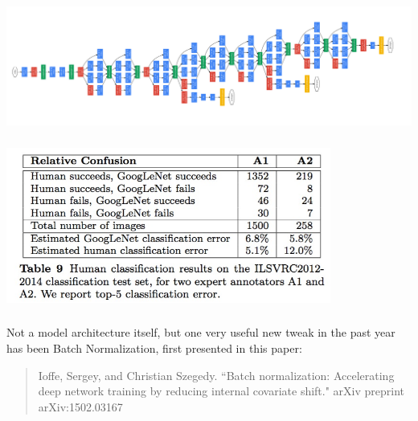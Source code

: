 \documentclass[xetex,mathserif,serif,aspectratio=169]{beamer}
\begin{document}
\begin{frame}[fragile] \frametitle{} \oldB \small

\begin{center}
\includegraphics[width=\textwidth]{img/googlenet_diagram.png}
\end{center}

\end{frame}

\begin{frame}[fragile] \frametitle{} \oldB \small

\textbf{}

\end{frame}

\begin{frame}[fragile] \frametitle{} \oldB \small

\begin{center}
\includegraphics[width=0.8\textwidth]{img/googLeNetVsHuman.jpg}
\end{center}

\end{frame}

\begin{frame}[fragile] \frametitle{} \oldB \small


Not a model architecture itself, but one very useful new tweak in
the past year has been Batch Normalization, first presented in this
paper:
\begin{quote}
 Ioffe, Sergey, and Christian Szegedy. ``Batch normalization: Accelerating deep network training by reducing internal covariate shift." arXiv preprint arXiv:1502.03167
\end{quote}

\end{frame}
\end{document}
